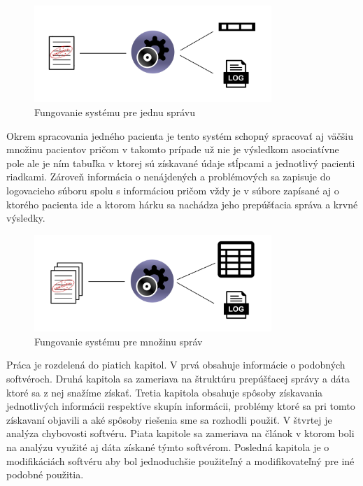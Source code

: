 \begin{figure}
	\centerline{\includegraphics[width=0.8\textwidth]{images/system_jedna_sprava}}
	\caption[Fungovanie systému pre jednu správu]{Fungovanie systému pre jednu správu}
	\label{obr:systemJedna}
\end{figure}
\newpage
Okrem spracovania jedného pacienta je tento systém schopný spracovať aj väčšiu množinu pacientov pričom v takomto prípade už nie je výsledkom asociatívne pole ale je ním tabuľka v ktorej sú získavané údaje stĺpcami a jednotlivý pacienti riadkami. Zároveň informácia o nenájdených a problémových sa zapisuje do logovacieho súboru spolu s informáciou pričom vždy je v súbore zapísané aj o ktorého pacienta ide a ktorom hárku sa nachádza jeho prepúšťacia správa a krvné výsledky.
\begin{figure}
	\centerline{\includegraphics[width=0.8\textwidth]{images/system_viac_sprav}}
	\caption[Fungovanie systému pre množinu správ]{Fungovanie systému pre množinu správ}
	\label{obr:systemJedna}
\end{figure}

Práca je rozdelená do piatich kapitol. V prvá obsahuje informácie o podobných softvéroch. Druhá kapitola sa zameriava na štruktúru prepúšťacej správy a dáta ktoré sa z nej snažíme získať. Tretia kapitola obsahuje spôsoby získavania jednotlivých informácii respektíve skupín informácii, problémy ktoré sa pri tomto získavaní objavili a aké spôsoby riešenia sme sa rozhodli použiť. V štvrtej je analýza chybovosti softvéru. Piata kapitole sa zameriava na článok v ktorom boli na analýzu využité aj dáta získané týmto softvérom. Posledná kapitola je o modifikáciách softvéru aby bol jednoduchšie použiteľný a modifikovateľný pre iné podobné použitia.

